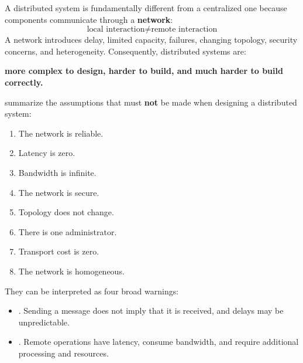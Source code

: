 \highspace
\begin{takeawaysbox}
    A distributed system is fundamentally different from a centralized one
    because components communicate through a \textbf{network}:
    \begin{equation*}
        \boxed{
            \text{local interaction}
            \neq
            \text{remote interaction}
        }
    \end{equation*}
    A network introduces delay, limited capacity, failures, changing topology,
    security concerns, and heterogeneity. Consequently, distributed systems
    are:
    \begin{center}
        \textbf{more complex to design, harder to build, and much harder to
        build correctly.}
    \end{center}
     summarize the
    assumptions that must \textbf{not} be made when designing a distributed
    system:
    \begin{enumerate}

        \item The network is reliable.

        \item Latency is zero.

        \item Bandwidth is infinite.

        \item The network is secure.

        \item Topology does not change.

        \item There is one administrator.

        \item Transport cost is zero.

        \item The network is homogeneous.

    \end{enumerate}
    They can be interpreted as four broad warnings:
    \begin{itemize}

        \item {}.
            Sending a message does not imply that it is received, and delays may
            be unpredictable.

        \item {}.
            Remote operations have latency, consume bandwidth, and require
            additional processing and resources.


\end{itemize}
\end{takeawaysbox}
